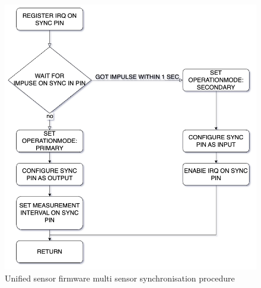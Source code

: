 \begin{figure}
\centering
\includegraphics{./generated_images/border_Unified_sensor_firmware_multi_sensor_synchronisation_procedure.png}
\caption{Unified sensor firmware multi sensor synchronisation procedure
\label{Unified_sensor_firmware_multi_sensor_synchronisation_procedure.png}}
\end{figure}

